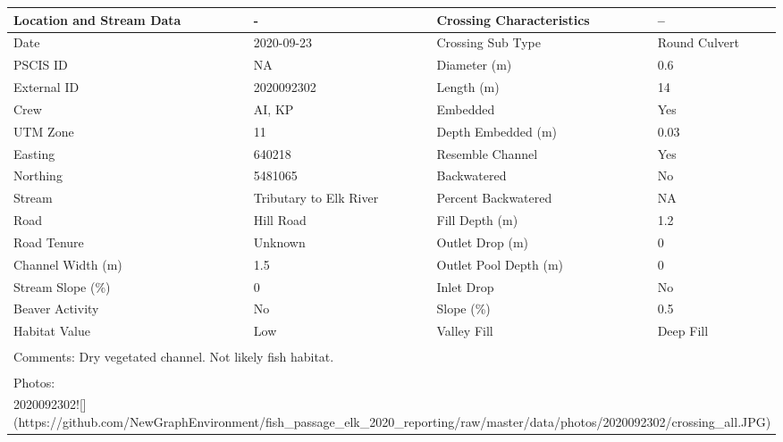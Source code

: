 \documentclass[
]{book}
\begin{document}
\begin{tabular}{l|l|l|l}
\hline
Location and Stream Data & - & Crossing Characteristics & --\\
\hline
Date & 2020-09-23 & Crossing Sub Type & Round Culvert\\
\hline
PSCIS ID & NA & Diameter (m) & 0.6\\
\hline
External ID & 2020092302 & Length (m) & 14\\
\hline
Crew & AI, KP & Embedded & Yes\\
\hline
UTM Zone & 11 & Depth Embedded (m) & 0.03\\
\hline
Easting & 640218 & Resemble Channel & Yes\\
\hline
Northing & 5481065 & Backwatered & No\\
\hline
Stream & Tributary to Elk River & Percent Backwatered & NA\\
\hline
Road & Hill Road & Fill Depth (m) & 1.2\\
\hline
Road Tenure & Unknown & Outlet Drop (m) & 0\\
\hline
Channel Width (m) & 1.5 & Outlet Pool Depth (m) & 0\\
\hline
Stream Slope (\%) & 0 & Inlet Drop & No\\
\hline
Beaver Activity & No & Slope (\%) & 0.5\\
\hline
Habitat Value & Low & Valley Fill & Deep Fill\\
\hline
\multicolumn{4}{l}{\textsuperscript{} Comments: Dry vegetated channel. Not likely fish habitat.}\\
\multicolumn{4}{l}{\textsuperscript{} Photos:}\\
\multicolumn{4}{l}{2020092302![](https://github.com/NewGraphEnvironment/fish\_passage\_elk\_2020\_reporting/raw/master/data/photos/2020092302/crossing\_all.JPG)}\\
\end{tabular}
\end{document}
